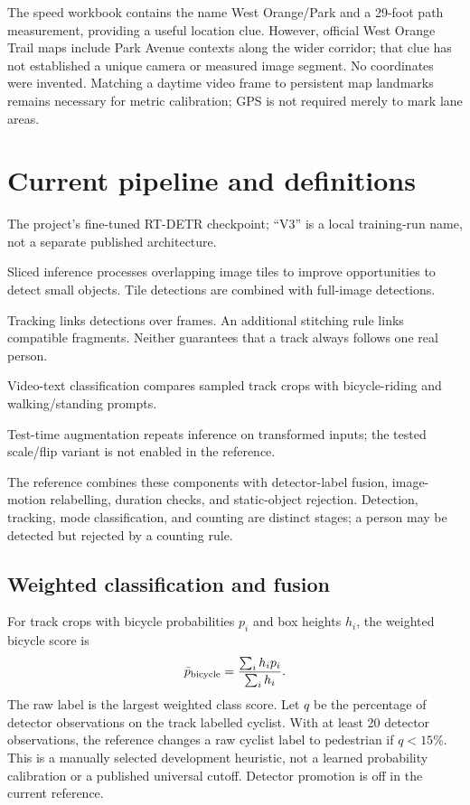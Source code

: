 \documentclass[11pt,letterpaper]{article}
\begin{document}
The speed workbook contains the name West Orange/Park and a 29-foot path measurement, providing a useful location clue. However, official West Orange Trail maps include Park Avenue contexts along the wider corridor\cite{trailmap}; that clue has not established a unique camera or measured image segment. No coordinates were invented. Matching a daytime video frame to persistent map landmarks remains necessary for metric calibration; GPS is not required merely to mark lane areas.

\section{Current pipeline and definitions}
\begin{description}[style=nextline]
\item[RT-DETR V3] The project's fine-tuned RT-DETR checkpoint; ``V3'' is a local training-run name, not a separate published architecture.
\item[SAHI] Sliced inference processes overlapping image tiles to improve opportunities to detect small objects. Tile detections are combined with full-image detections.
\item[ByteTrack and stitching] Tracking links detections over frames. An additional stitching rule links compatible fragments. Neither guarantees that a track always follows one real person.
\item[X-CLIP] Video-text classification compares sampled track crops with bicycle-riding and walking/standing prompts.
\item[TTA] Test-time augmentation repeats inference on transformed inputs; the tested scale/flip variant is not enabled in the reference.
\end{description}
The reference combines these components with detector-label fusion, image-motion relabelling, duration checks, and static-object rejection. Detection, tracking, mode classification, and counting are distinct stages; a person may be detected but rejected by a counting rule.

\subsection{Weighted classification and fusion}
For track crops with bicycle probabilities $p_i$ and box heights $h_i$, the weighted bicycle score is
\[
 \bar p_{\rm bicycle}=\frac{\sum_i h_i p_i}{\sum_i h_i}.
\]
The raw label is the largest weighted class score. Let $q$ be the percentage of detector observations on the track labelled cyclist. With at least 20 detector observations, the reference changes a raw cyclist label to pedestrian if $q<15\%$. This is a manually selected development heuristic, not a learned probability calibration or a published universal cutoff. Detector promotion is off in the current reference.
\end{document}
